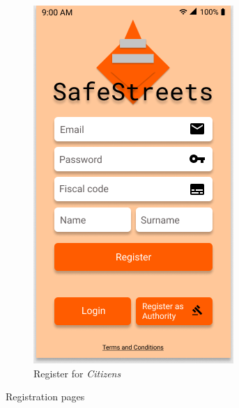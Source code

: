 \documentclass{article}
\begin{document}
\begin{figure}[H]
\begin{subfigure}{0.5\textwidth}
        \includegraphics[width=0.9\linewidth]{img/mockups/register_citizen.png}
        \caption{Register for \textit{Citizens}}
        \label{fig:subim2}
    \end{subfigure}
    \caption{Registration pages}
    \label{fig:image2}
\end{figure}

\clearpage
\end{document}
